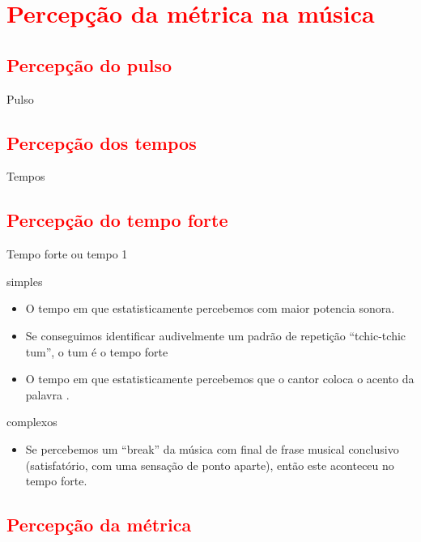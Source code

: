 \section{\textcolor{red}{Percepção da métrica na música}}

\subsection{\textcolor{red}{Percepção do pulso}}
Pulso


\subsection{\textcolor{red}{Percepção dos tempos}}
Tempos


\subsection{\textcolor{red}{Percepção do tempo forte}}
Tempo forte ou tempo 1

simples
\begin{itemize}
\item O tempo em que estatisticamente percebemos com maior potencia sonora. 
\item Se conseguimos identificar audivelmente um padrão de repetição ``tchic-tchic tum'', o tum é o tempo forte
\item O tempo em que estatisticamente percebemos que o cantor  coloca o acento da palavra \cite[pp. 149]{medteoria}. 
\end{itemize}

complexos 
\begin{itemize}
\item Se percebemos um ``break'' da música com final de frase musical conclusivo 
(satisfatório, com uma sensação de ponto aparte), então este aconteceu no tempo forte.
\end{itemize}


\subsection{\textcolor{red}{Percepção da métrica}}


